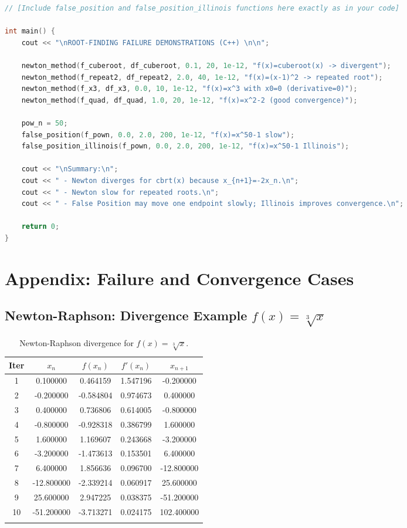 \documentclass[12pt,a4paper]{article}
\begin{document}
\begin{lstlisting}[language=C++, caption={Demonstration of Root-Finding Failures}, label={lst:rootfailure}]
// [Include false_position and false_position_illinois functions here exactly as in your code]

int main() {
    cout << "\nROOT-FINDING FAILURE DEMONSTRATIONS (C++) \n\n";

    newton_method(f_cuberoot, df_cuberoot, 0.1, 20, 1e-12, "f(x)=cuberoot(x) -> divergent");
    newton_method(f_repeat2, df_repeat2, 2.0, 40, 1e-12, "f(x)=(x-1)^2 -> repeated root");
    newton_method(f_x3, df_x3, 0.0, 10, 1e-12, "f(x)=x^3 with x0=0 (derivative=0)");
    newton_method(f_quad, df_quad, 1.0, 20, 1e-12, "f(x)=x^2-2 (good convergence)");

    pow_n = 50;
    false_position(f_pown, 0.0, 2.0, 200, 1e-12, "f(x)=x^50-1 slow");
    false_position_illinois(f_pown, 0.0, 2.0, 200, 1e-12, "f(x)=x^50-1 Illinois");

    cout << "\nSummary:\n";
    cout << " - Newton diverges for cbrt(x) because x_{n+1}=-2x_n.\n";
    cout << " - Newton slow for repeated roots.\n";
    cout << " - False Position may move one endpoint slowly; Illinois improves convergence.\n";

    return 0;
}
\end{lstlisting}




\section*{Appendix: Failure and Convergence Cases}

\subsection*{Newton-Raphson: Divergence Example $f(x) = \sqrt[3]{x}$}

\begin{longtable}{|c|c|c|c|c|}
\hline
Iter & $x_n$ & $f(x_n)$ & $f'(x_n)$ & $x_{n+1}$ \\ \hline
1 & 0.100000 & 0.464159 & 1.547196 & -0.200000 \\
2 & -0.200000 & -0.584804 & 0.974673 & 0.400000 \\
3 & 0.400000 & 0.736806 & 0.614005 & -0.800000 \\
4 & -0.800000 & -0.928318 & 0.386799 & 1.600000 \\
5 & 1.600000 & 1.169607 & 0.243668 & -3.200000 \\
6 & -3.200000 & -1.473613 & 0.153501 & 6.400000 \\
7 & 6.400000 & 1.856636 & 0.096700 & -12.800000 \\
8 & -12.800000 & -2.339214 & 0.060917 & 25.600000 \\
9 & 25.600000 & 2.947225 & 0.038375 & -51.200000 \\
10 & -51.200000 & -3.713271 & 0.024175 & 102.400000 \\
\hline
\caption{Newton-Raphson divergence for $f(x) = \sqrt[3]{x}$.}
\label{tab:newton-divergence}
\end{longtable}
\end{document}
